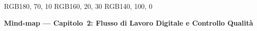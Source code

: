 

\definecolor{cPre} {RGB}{180,  70,  10}   %
\definecolor{cCQ}  {RGB}{160,  20,  30}   %
\definecolor{cDoc} {RGB}{140, 100,   0}   %



\begin{center}
  {\large\bfseries Mind-map ---
   Capitolo~2: Flusso di Lavoro Digitale e Controllo Qualit\`a}
\end{center}

\vspace{-2pt}

